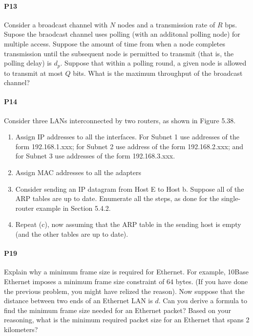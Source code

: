 \documentclass[12pt,letterpaper]{article}
\begin{document}
\paragraph{P13}
Consider a broadcast channel with $N$ nodes and a transmission rate of $R$ bps.
Supose the braodcast channel uses polling (with an additonal polling node) for
multiple access. Suppose the amount of time from when a node completes 
transmission until the subsequent node is permitted to transmit (that is, the
polling delay) is $d_{p}$. Suppose that within a polling round, a given node is
allowed to transmit at most $Q$ bits. What is the maximum throughput of the
broadcast channel?

\paragraph{P14}
Consider three LANs interconnected by two routers, as shown in Figure 5.38.
\begin{enumerate}
\item Assign IP addresses to all the interfaces. For Subnet 1 use addresses
    of the form 192.168.1.xxx; for Subnet 2 use address of the form 
    192.168.2.xxx; and for Subnet 3 use addresses of the form 192.168.3.xxx.
\item Assign MAC addresses to all the adapters
\item Consider sending an IP datagram from Host E to Host b. Suppose all of
    the ARP tables are up to date. Enumerate all the steps, as done for the
    single-router example in Section 5.4.2.
\item Repeat (c), now assuming that the ARP table in the sending host is empty
    (and the other tables are up to date).
\end{enumerate}
\paragraph{P19}
Explain why a minimum frame size is required for Ethernet. For example, 10Base
Ethernet imposes a minimum frame size constraint of 64 bytes. (If you have done
the previous problem, you might have relized the reason). Now suppose that the
distance between two ends of an Ethernet LAN is $d$. Can you derive a formula
to find the minimum frame size needed for an Ethernet packet? Based on your
reasoning, what is the minimum required packet size for an Ethernet that spans
2 kilometers?
\end{document}
